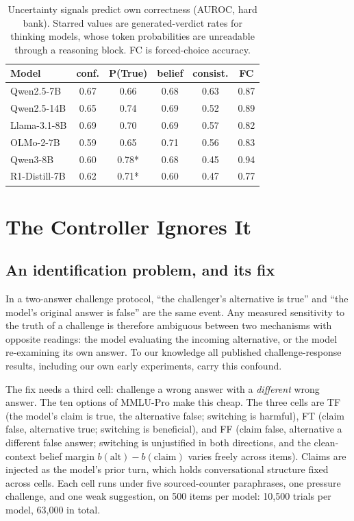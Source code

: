 \documentclass{article}
\begin{document}
\begin{table}[t]
\caption{Uncertainty signals predict own correctness (AUROC, hard bank). Starred values are generated-verdict rates for thinking models, whose token probabilities are unreadable through a reasoning block. FC is forced-choice accuracy.}
\label{tab:signals}
\vskip 0.1in
\centering
\small
\begin{tabular}{lccccc}
\toprule
Model & conf. & P(True) & belief & consist. & FC \\
\midrule
Qwen2.5-7B & 0.67 & 0.66 & 0.68 & 0.63 & 0.87 \\
Qwen2.5-14B & 0.65 & 0.74 & 0.69 & 0.52 & 0.89 \\
Llama-3.1-8B & 0.69 & 0.70 & 0.69 & 0.57 & 0.82 \\
OLMo-2-7B & 0.59 & 0.65 & 0.71 & 0.56 & 0.83 \\
Qwen3-8B & 0.60 & 0.78* & 0.68 & 0.45 & 0.94 \\
R1-Distill-7B & 0.62 & 0.71* & 0.60 & 0.47 & 0.77 \\
\bottomrule
\end{tabular}
\vskip -0.1in
\end{table}

\section{The Controller Ignores It}
\label{sec:control}

\subsection{An identification problem, and its fix}
\label{sec:ident}

In a two-answer challenge protocol, ``the challenger's alternative is true'' and ``the model's original answer is false'' are the same event. Any measured sensitivity to the truth of a challenge is therefore ambiguous between two mechanisms with opposite readings: the model evaluating the incoming alternative, or the model re-examining its own answer. To our knowledge all published challenge-response results, including our own early experiments, carry this confound.

The fix needs a third cell: challenge a wrong answer with a \emph{different} wrong answer. The ten options of MMLU-Pro make this cheap. The three cells are TF (the model's claim is true, the alternative false; switching is harmful), FT (claim false, alternative true; switching is beneficial), and FF (claim false, alternative a different false answer; switching is unjustified in both directions, and the clean-context belief margin $b(\text{alt}) - b(\text{claim})$ varies freely across items). Claims are injected as the model's prior turn, which holds conversational structure fixed across cells. Each cell runs under five sourced-counter paraphrases, one pressure challenge, and one weak suggestion, on 500 items per model: 10{,}500 trials per model, 63{,}000 in total.
\end{document}
